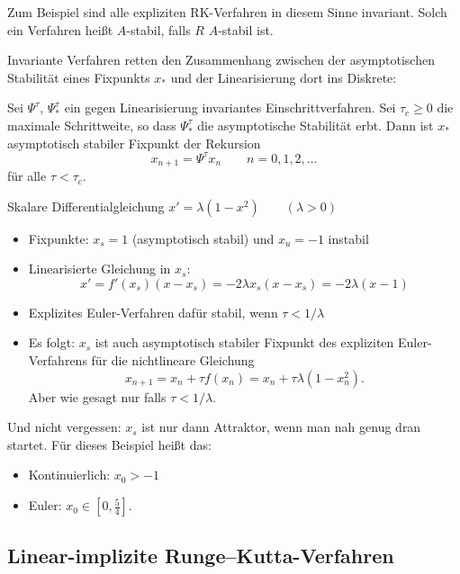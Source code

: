 Zum Beispiel sind alle expliziten RK-Verfahren in diesem Sinne invariant. Solch ein Verfahren heißt $A$-stabil, falls $R$ $A$-stabil ist.

Invariante Verfahren retten den Zusammenhang zwischen der asymptotischen Stabilität eines Fixpunkts $x_*$ und der Linearisierung dort ins Diskrete:

\begin{satz}
	Sei $\Psi^\tau$, $\Psi^\tau_*$ ein gegen Linearisierung invariantes Einschrittverfahren. Sei $\tau_c\geq 0$ die maximale Schrittweite, so dass $\Psi^\tau_*$ die asymptotische Stabilität erbt. Dann ist $x_*$ asymptotisch stabiler Fixpunkt der Rekursion
	\begin{equation*}
		x_{n+1} = \Psi^\tau x_n\qquad n=0,1,2,\hdots
	\end{equation*}
	für alle $\tau<\tau_c$.
\end{satz}

\begin{bsp}
	Skalare Differentialgleichung $x' = \lambda(1-x^2) \qquad (\lambda > 0)$
	\begin{itemize}
		\item Fixpunkte: $ x_s = 1$ (asymptotisch stabil) und $x_u = -1$ instabil	
		\item Linearisierte Gleichung in $x_s$:
		\begin{equation*}
			x' = f'(x_s)(x-x_s) = -2\lambda x_s(x-x_s) = -2\lambda(x-1)
		\end{equation*}
		\item Explizites Euler-Verfahren dafür stabil, wenn $\tau< 1/\lambda$
		\item Es folgt: $x_s$ ist auch asymptotisch stabiler Fixpunkt des expliziten Euler-Verfahrens für die nichtlineare Gleichung
		\begin{equation*}
			x_{n+1} = x_n + \tau f(x_n) = x_n + \tau\lambda(1-x_n^2).
		\end{equation*}
		Aber wie gesagt nur falls $\tau< 1/\lambda$.
	\end{itemize}
	Und nicht vergessen: $x_s$ ist nur dann Attraktor, wenn man nah genug dran startet. Für dieses Beispiel heißt das:
	\begin{itemize}
		\item Kontinuierlich: $x_0>-1$
		\item Euler: $x_0\in[0, \frac{5}{4}]$.
	\end{itemize}
\end{bsp}

\subsection{Linear-implizite Runge--Kutta-Verfahren}

